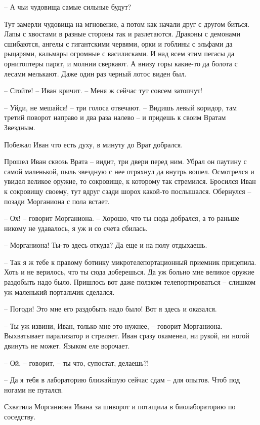 \documentclass[ebook,oneside,final,openright]{memoir}
\begin{document}
– А чьи чудовища самые сильные будут?\par
Тут замерли чудовища на мгновение, а потом как начали друг с другом биться. Лапы с хвостами в разные стороны так и разлетаются. Драконы с демонами сшибаются, ангелы с гигантскими червями, орки и гоблины с эльфами да рыцарями, кальмары огромные с василисками. И над всем этим пегасы да орнитоптеры парят, и молнии сверкают. А внизу горы какие-то да болота с лесами мелькают. Даже один раз черный лотос виден был. \par
– Стойте! – Иван кричит. – Меня ж сейчас тут совсем затопчут!\par
– Уйди, не мешайся! – три голоса отвечают. – Видишь левый коридор, там третий поворот направо и два раза налево – и придешь к своим Вратам Звездным.\par
\par
Побежал Иван что есть духу, в минуту до Врат добрался.\par
\par
Прошел Иван сквозь Врата – видит, три двери перед ним. Убрал он паутину с самой маленькой, пыль звездную с нее отряхнул да внутрь вошел. Осмотрелся и увидел великое оружие, то сокровище, к которому так стремился. Бросился Иван к сокровищу своему, тут вдруг сзади шорох какой-то послышался. Обернулся – позади Морганиона с пола встает.\par
– Ох! – говорит Морганиона. – Хорошо, что ты сюда добрался, а то раньше никому не удавалось, я уж и со счета сбилась.\par
– Морганиона! Ты-то здесь откуда? Да еще и на полу отдыхаешь.\par
– Так я ж тебе к правому ботинку микротелепортационный приемник прицепила. Хоть и не верилось, что ты сюда доберешься. Да уж больно мне великое оружие раздобыть надо было. Пришлось вот даже ползком телепортироваться – слишком уж маленький портальчик сделался.\par
– Погоди! Это мне его раздобыть надо было! Вот я здесь и оказался.\par
– Ты уж извини, Иван, только мне это нужнее, – говорит Морганиона. Выхватывает парализатор и стреляет. Иван сразу окаменел, ни рукой, ни ногой двинуть не может. Языком еле ворочает.\par
– Ой, – говорит, – ты что, супостат, делаешь?!\par
– Да я тебя в лабораторию ближайшую сейчас сдам – для опытов. Чтоб под ногами не путался.\par
Схватила Морганиона Ивана за шиворот и потащила в биолабораторию по соседству.\par
\end{document}
